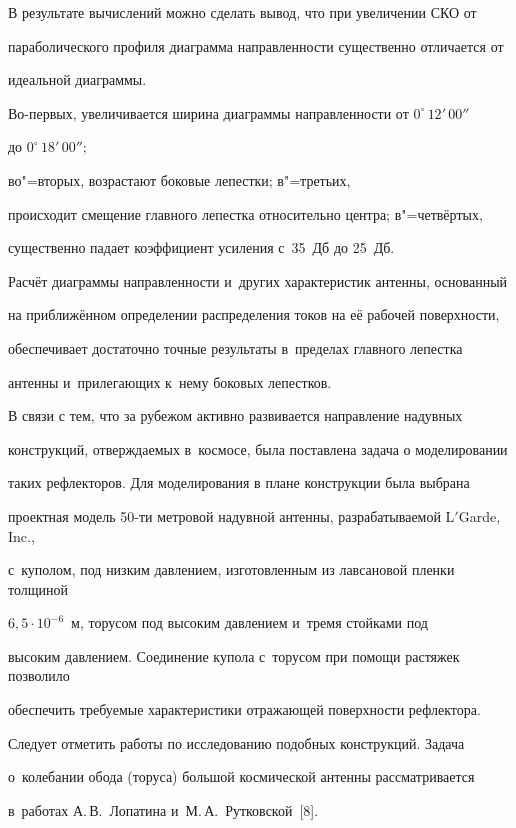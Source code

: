 В результате вычислений можно сделать вывод, что при увеличении СКО от 

параболического профиля диаграмма направленности существенно отличается от 

идеальной диаграммы.



Во-первых, увеличивается ширина диаграммы направленности от $0^{\circ}\,12'\,00''$ 

до $0^{\circ}\,18'\,00''$; 

во"=вторых, возрастают боковые лепестки; в"=третьих, 

происходит смещение главного лепестка относительно центра; в"=четвёртых, 

существенно падает коэффициент усиления с~35~Дб до 25~Дб. 



Расчёт диаграммы направленности и~других характеристик антенны, основанный 

на приближённом определении распределения токов на её рабочей поверхности, 

обеспечивает достаточно точные результаты в~пределах главного лепестка 

антенны и~прилегающих к~нему боковых лепестков.



В связи с тем, что за рубежом активно развивается направление надувных 

конструкций, отверждаемых в~космосе, была поставлена задача о моделировании 

таких рефлекторов. Для моделирования в плане конструкции была выбрана 

проектная модель 50-ти метровой надувной антенны, разрабатываемой L$'$Garde, Inc., 

с~куполом, под низким давлением, изготовленным из лавсановой пленки толщиной 

$6,5\cdot 10^{-6}$~м, торусом под высоким давлением и~тремя стойками под 

высоким давлением. Соединение купола с~торусом при помощи растяжек позволило 

обеспечить требуемые характеристики отражающей поверхности рефлектора. 



Следует отметить работы по исследованию подобных конструкций. Задача 

о~колебании обода (торуса) большой космической антенны рассматривается 

в~работах А.\,В.~Лопатина и~М.\,А.~Рутковской~[8]. 



